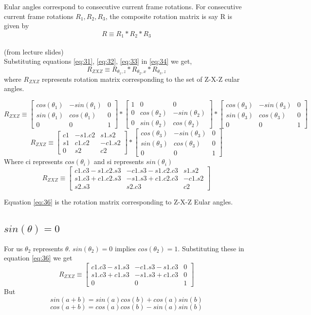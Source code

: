 \documentclass[12pt]{article}
\newcommand{\fromslides}{{\\ \color{blue} \hspace*{\fill}(from lecture slides)} \\}
\newcommand{\rx}[1]{\begin{bmatrix} 1 & 0 & 0 \\ 0 & cos(#1) & -sin(#1) \\ 0 & sin(#1) & cos(#1) \end{bmatrix}}
\newcommand{\rz}[1]{\begin{bmatrix} cos(#1) & -sin(#1) & 0 \\ sin(#1) & cos(#1) & 0 \\ 0 & 0 & 1 \end{bmatrix}}
\begin{document}
Eular angles correspond to consecutive current frame rotations.
For consecutive current frame rotations $ R_1, R_2, R_3 $, the composite rotation matrix is say R is given by
\begin{equation}
  \label{eq:34}
  R \equiv R_1 * R_2 * R_3
\end{equation}
\fromslides

Substituting equations \ref{eq:31}, \ref{eq:32}, \ref{eq:33} in \ref{eq:34} we get,
\begin{equation}
  \label{eq:35}
  R_{ZXZ} \equiv R_{\theta_1,z} * R_{\theta_2,x} * R_{\theta_3,z}
\end{equation}
where $ R_{ZXZ} $ represents rotation matrix corresponding to the set of Z-X-Z eular angles.

\[
  R_{ZXZ} \equiv \rz{\theta_1} * \rx{\theta_2} * \rz{\theta_3}
\]
\[
  R_{ZXZ} \equiv \begin{bmatrix} c1 & -s1.c2 & s1.s2 \\ s1 & c1.c2 & -c1.s2 \\ 0 & s2 & c2 \end{bmatrix} * \rz{\theta_3}
\]
Where ci represents $ cos(\theta_i) $ and si represents $ sin(\theta_i) $
\begin{equation}
  \label{eq:36}
  R_{ZXZ} \equiv \begin{bmatrix} c1.c3 - s1.c2.s3 & -c1.s3 - s1.c2.c3 & s1.s2 \\ s1.c3 + c1.c2.s3 & -s1.s3 + c1.c2.c3 & -c1.s2 \\ s2.s3 & s2.c3 & c2 \end{bmatrix}
\end{equation}

Equation \ref{eq:36} is the rotation matrix corresponding to Z-X-Z Eular angles.

\subsection{$sin(\theta) = 0$}
For us $\theta_2$ represents $\theta$.
$sin(\theta_2) = 0$ implies $cos(\theta_2) = 1$. Substituting these in equation \ref{eq:36} we get
\begin{equation}
  \label{eq:37}
  R_{ZXZ} \equiv \begin{bmatrix} c1.c3 - s1.s3 & -c1.s3 - s1.c3 & 0 \\ s1.c3 + c1.s3 & -s1.s3 + c1.c3 & 0 \\ 0 & 0 & 1 \end{bmatrix}
\end{equation}
But
\begin{equation}
  \label{eq:38}
  sin(a + b) = sin(a)cos(b) + cos(a)sin(b)
\end{equation}
\begin{equation}
  \label{eq:39}
  cos(a + b) = cos(a)cos(b) - sin(a)sin(b)
\end{equation}
\end{document}
